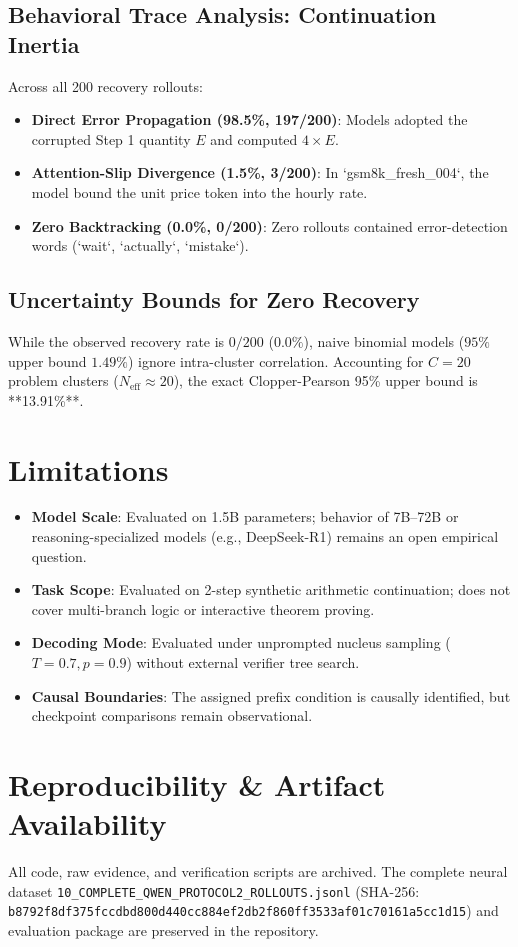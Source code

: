 \documentclass[10pt,conference]{IEEEtran}
\begin{document}
\subsection{Behavioral Trace Analysis: Continuation Inertia}
Across all 200 recovery rollouts:
\begin{itemize}
    \item \textbf{Direct Error Propagation (98.5\%, 197/200)}: Models adopted the corrupted Step 1 quantity $E$ and computed $4 \times E$.
    \item \textbf{Attention-Slip Divergence (1.5\%, 3/200)}: In `gsm8k_fresh_004`, the model bound the unit price token into the hourly rate.
    \item \textbf{Zero Backtracking (0.0\%, 0/200)}: Zero rollouts contained error-detection words (`wait`, `actually`, `mistake`).
\end{itemize}

\subsection{Uncertainty Bounds for Zero Recovery}
While the observed recovery rate is $0/200$ ($0.0\%$), naive binomial models ($95\%$ upper bound $1.49\%$) ignore intra-cluster correlation. Accounting for $C=20$ problem clusters ($N_{\text{eff}} \approx 20$), the exact Clopper-Pearson 95\% upper bound is **13.91\%**.

\section{Limitations}
\begin{itemize}
    \item \textbf{Model Scale}: Evaluated on 1.5B parameters; behavior of 7B--72B or reasoning-specialized models (e.g., DeepSeek-R1) remains an open empirical question.
    \item \textbf{Task Scope}: Evaluated on 2-step synthetic arithmetic continuation; does not cover multi-branch logic or interactive theorem proving.
    \item \textbf{Decoding Mode}: Evaluated under unprompted nucleus sampling ($T=0.7, p=0.9$) without external verifier tree search.
    \item \textbf{Causal Boundaries}: The assigned prefix condition is causally identified, but checkpoint comparisons remain observational.
\end{itemize}

\section{Reproducibility \& Artifact Availability}
All code, raw evidence, and verification scripts are archived. The complete neural dataset \texttt{10\_COMPLETE\_QWEN\_PROTOCOL2\_ROLLOUTS.jsonl} (SHA-256: \texttt{b8792f8df375fccdbd800d440cc884ef2db2f860ff3533af01c70161a5cc1d15}) and evaluation package are preserved in the repository.
\end{document}
